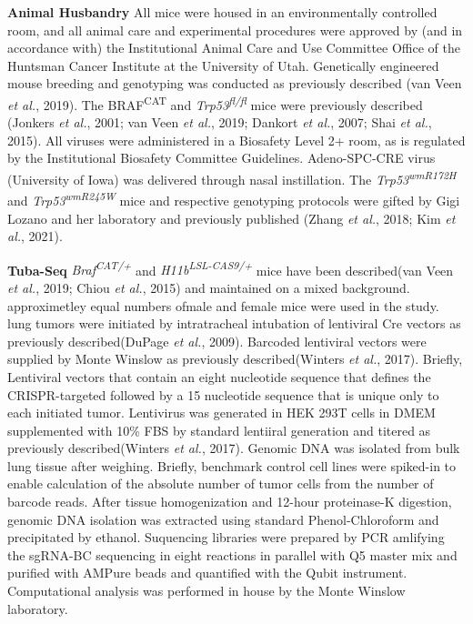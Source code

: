 \textbf{Animal Husbandry} All mice were housed in an environmentally controlled room, and all animal care and experimental procedures were approved by (and in accordance with) the Institutional Animal Care and Use Committee Office of the Huntsman Cancer Institute at the University of Utah. Genetically engineered mouse breeding and genotyping was conducted as previously described (van Veen \emph{et al.}, 2019). The BRAF\textsuperscript{CAT} and \emph{Trp53\textsuperscript{fl/fl}} mice were previously described (Jonkers \emph{et al.}, 2001; van Veen \emph{et al.}, 2019; Dankort \emph{et al.}, 2007; Shai \emph{et al.}, 2015). All viruses were administered in a Biosafety Level 2+ room, as is regulated by the Institutional Biosafety Committee Guidelines. Adeno-SPC-CRE virus (University of Iowa) was delivered through nasal instillation. The \emph{Trp53\textsuperscript{wmR172H}} and \emph{Trp53\textsuperscript{wmR245W}} mice and respective genotyping protocols were gifted by Gigi Lozano and her laboratory and previously published (Zhang \emph{et al.}, 2018; Kim \emph{et al.}, 2021).

\textbf{Tuba-Seq} \emph{Braf\textsuperscript{CAT/+}} and \emph{H11b\textsuperscript{LSL-CAS9/+}} mice have been described(van Veen \emph{et al.}, 2019; Chiou \emph{et al.}, 2015) and maintained on a mixed background. approximetley equal numbers ofmale and female mice were used in the study. lung tumors were initiated by intratracheal intubation of lentiviral Cre vectors as previously described(DuPage \emph{et al.}, 2009). Barcoded lentiviral vectors were supplied by Monte Winslow as previously described(Winters \emph{et al.}, 2017). Briefly, Lentiviral vectors that contain an eight nucleotide sequence that defines the CRISPR-targeted followed by a 15 nucleotide sequence that is unique only to each initiated tumor. Lentivirus was generated in HEK 293T cells in DMEM supplemented with 10\% FBS by standard lentiiral generation and titered as previously described(Winters \emph{et al.}, 2017). Genomic DNA was isolated from bulk lung tissue after weighing. Briefly, benchmark control cell lines were spiked-in to enable calculation of the absolute number of tumor cells from the number of barcode reads. After tissue homogenization and 12-hour proteinase-K digestion, genomic DNA isolation was extracted using standard Phenol-Chloroform and precipitated by ethanol. Suquencing libraries were prepared by PCR amlifying the sgRNA-BC sequencing in eight reactions in parallel with Q5 master mix and purified with AMPure beads and quantified with the Qubit instrument. Computational analysis was performed in house by the Monte Winslow laboratory.

